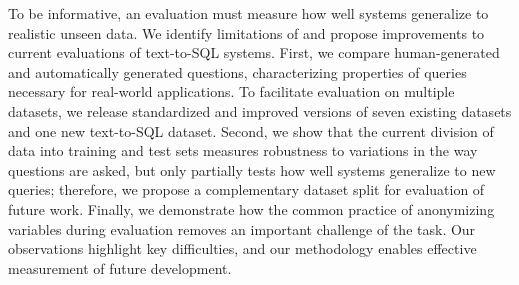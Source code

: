To be informative, an evaluation must measure how well systems generalize to realistic unseen data. We identify limitations of and propose improvements to current evaluations of text-to-SQL systems. First, we compare human-generated and automatically generated questions, characterizing properties of queries necessary for real-world applications. To facilitate evaluation on multiple datasets, we release standardized and improved versions of seven existing datasets and one new text-to-SQL dataset. Second, we show that the current division of data into training and test sets measures robustness to variations in the way questions are asked, but only partially tests how well systems generalize to new queries; therefore, we propose a complementary dataset split for evaluation of future work. Finally, we demonstrate how the common practice of anonymizing variables during evaluation removes an important challenge of the task. Our observations highlight key difficulties, and our methodology enables effective measurement of future development.
